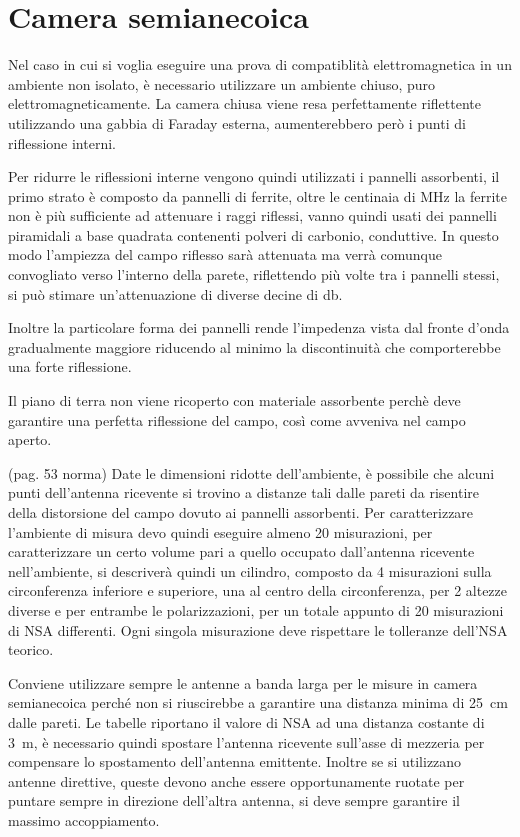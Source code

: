 
\section{Camera semianecoica}
Nel caso in cui si voglia eseguire una prova di compatiblità elettromagnetica
in un ambiente non isolato, è necessario utilizzare un ambiente chiuso,
puro elettromagneticamente.
La camera chiusa viene resa perfettamente riflettente utilizzando una gabbia di Faraday esterna,
aumenterebbero però i punti di riflessione interni.

Per ridurre le riflessioni interne vengono quindi utilizzati i pannelli assorbenti,
il primo strato è composto da pannelli di ferrite, oltre le centinaia di \si{\mega\hertz} la ferrite
non è più sufficiente ad attenuare i raggi riflessi, vanno quindi usati dei pannelli piramidali a base quadrata 
contenenti polveri di carbonio, conduttive. In questo modo l'ampiezza del campo riflesso sarà attenuata 
ma verrà comunque convogliato verso l'interno della parete, riflettendo più volte tra i pannelli stessi, 
si può stimare un'attenuazione di diverse decine di \si{\decibel}.

Inoltre la particolare forma dei pannelli rende l'impedenza vista dal fronte d'onda gradualmente maggiore
riducendo al minimo la discontinuità che comporterebbe una forte riflessione.

Il piano di terra non viene ricoperto con materiale assorbente perchè deve garantire una perfetta
riflessione del campo, così come avveniva nel campo aperto.

(pag. 53 norma)
Date le dimensioni ridotte dell'ambiente, è possibile che alcuni punti dell'antenna ricevente si trovino a
distanze tali dalle pareti da risentire della distorsione del campo dovuto ai pannelli assorbenti.
Per caratterizzare l'ambiente di misura devo quindi eseguire almeno 20 misurazioni,
per caratterizzare un certo volume pari a quello occupato dall'antenna ricevente nell'ambiente,
si descriverà quindi un cilindro, composto da 4 misurazioni sulla circonferenza inferiore e superiore,
una al centro della circonferenza, per 2 altezze diverse e per entrambe le polarizzazioni,
per un totale appunto di 20 misurazioni di NSA differenti. Ogni singola misurazione deve rispettare 
le tolleranze dell'NSA teorico.

Conviene utilizzare sempre le antenne a banda larga per le misure in camera semianecoica
perché non si riuscirebbe a garantire una distanza minima di \SI{25}{\centi\meter} dalle pareti.
Le tabelle riportano il valore di NSA ad una distanza costante di \SI{3}{\meter}, è necessario
quindi spostare l'antenna ricevente sull'asse di mezzeria per compensare lo spostamento dell'antenna emittente.
Inoltre se si utilizzano antenne direttive, queste devono anche essere opportunamente ruotate
per puntare sempre in direzione dell'altra antenna, si deve sempre garantire il massimo accoppiamento.

